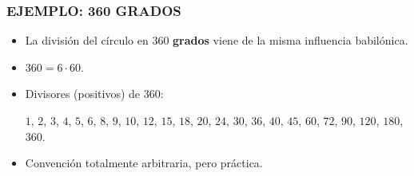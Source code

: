 \begin{frame}
  \frametitle{EJEMPLO: 360 GRADOS}

  \begin{minipage}[t][0.8\textheight]{0.6\textwidth}
    \vspace{0pt}
    \begin{itemize}
    \item<2-> La división del círculo en $360$ \textbf{grados} viene de la misma
      influencia babilónica.

    \item<3-> $360 = 6 \cdot 60$.

    \item<4-> Divisores (positivos) de $360$:

      $1$, $2$, $3$, $4$, $5$, $6$, $8$, $9$, $10$, $12$, $15$, $18$, $20$,
      $24$, $30$, $36$, $40$, $45$, $60$, $72$, $90$, $120$, $180$, $360$.

    \item<5-> Convención totalmente arbitraria, pero práctica.


\end{itemize}
\end{minipage}
\end{frame}
